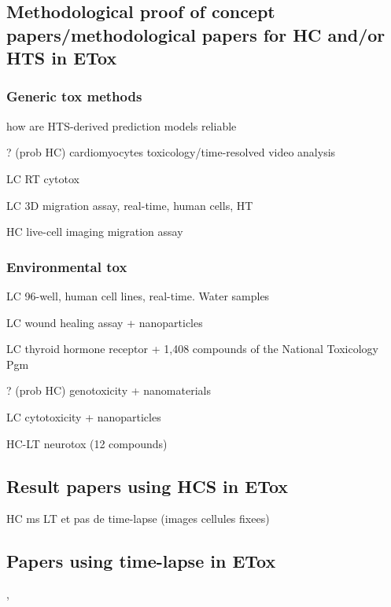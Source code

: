 \documentclass[12pt]{article}
\begin{document}
\subsection{Methodological proof of concept papers/methodological papers for HC and/or HTS in ETox}
\subsubsection{Generic tox methods}
\cite{pmid24845243} how are HTS-derived prediction models reliable

\cite{pmid24619905} ? (prob HC) cardiomyocytes toxicology/time-resolved video analysis

\cite{pmid21516415} LC RT cytotox 

\cite{pmid24141454} LC 3D migration assay, real-time, human cells, HT

\cite{pmid21748693} HC live-cell imaging migration assay
\subsubsection{Environmental tox}

\cite{pmid25637748} LC 96-well, human cell lines, real-time. Water samples

\cite{pmid24823434} LC wound healing assay + nanoparticles

\cite{pmid24772387} LC thyroid hormone receptor + 1,408 compounds of the National Toxicology Pgm

\cite{pmid24610750} ? (prob HC) genotoxicity + nanomaterials


\cite{pmid23856233} LC cytotoxicity + nanoparticles

\cite{pmid22312247} HC-LT neurotox (12 compounds)
\subsection{Result papers using HCS in ETox}
\cite{pmid24997295} HC ms LT et pas de time-lapse (images cellules fixees)
\subsection{Papers using time-lapse in ETox}


\cite{pmid17949680},~\cite{pmid15388243}


{}
\end{document}

